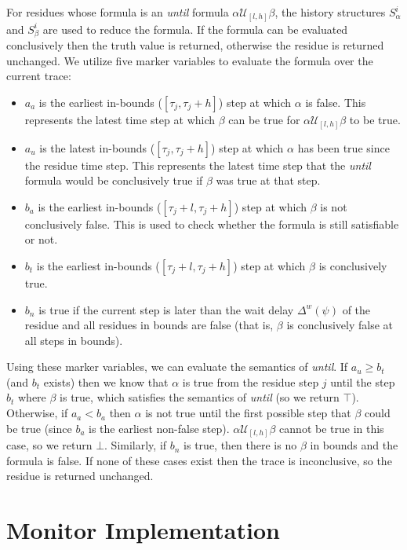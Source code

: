 \documentclass[]{../llncs/llncs}
\begin{document}
For residues whose formula is an \emph{until} formula $\alpha \mathcal{U}_{[l,h]} \beta$, the history structures $S^i_\alpha$ and $S^i_\beta$ are used to reduce the formula. 
If the formula can be evaluated conclusively then the truth value is returned, otherwise the residue is returned unchanged. 
We utilize five marker variables to evaluate the formula over the current trace: 
\begin{itemize}
\item $a_a$ is the earliest in-bounds ($[\tau_j,\tau_j+h]$) step at which $\alpha$ is false. This represents the latest time step at which $\beta$ can be true for $\alpha \mathcal{U}_{[l,h]} \beta$ to be true. 
\item $a_u$ is the latest in-bounds ($[\tau_j,\tau_j+h]$) step at which $\alpha$ has been true since the residue time step.  This represents the latest time step that the \emph{until} formula would be conclusively true if $\beta$ was true at that step. 
\item $b_a$ is the earliest in-bounds ($[\tau_j+l,\tau_j+h]$) step at which $\beta$ is not conclusively false. This is used to check whether the formula is still satisfiable or not.
\item $b_t$ is the earliest in-bounds ($[\tau_j+l,\tau_j+h]$) step at which $\beta$ is conclusively true.
\item $b_n$ is true if the current step is later than the wait delay $\Delta^w(\psi)$ of the residue and all residues in bounds are false (that is, $\beta$ is conclusively false at all steps in bounds).
\end{itemize}

Using these marker variables, we can evaluate the semantics of \emph{until}. If $a_u \geq b_t$ (and $b_t$ exists) then we know that $\alpha$ is true from the residue step $j$ until the step $b_t$ where $\beta$ is true, which satisfies the semantics of \emph{until} (so we return $\top$).
%
Otherwise, if $a_a < b_a$ then $\alpha$ is not true until the first possible step that $\beta$ could be true (since $b_a$ is the earliest non-false step). $\alpha \mathcal{U}_{[l,h]} \beta$ cannot be true in this case, so we return $\bot$. Similarly, if $b_n$ is true, then there is no $\beta$ in bounds and the formula is false.
%
If none of these cases exist then the trace is inconclusive, so the residue is returned unchanged.



\section{Monitor Implementation}
\end{document}
